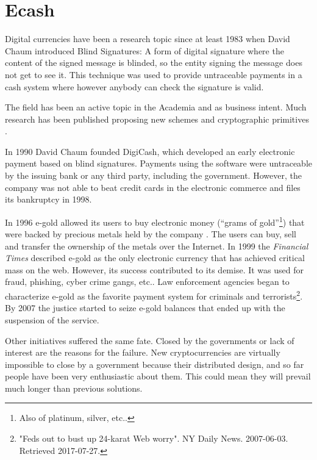 \section{Ecash}
Digital currencies have been a research topic since at least 1983 when David
  Chaum \cite{chaum1983blind} introduced Blind Signatures: A form of digital
  signature where the content of the signed message is blinded, so the entity
  signing the message does not get to see it. This technique was used to provide
  untraceable payments in a cash system where however anybody can check the
  signature is valid.

The field has been an active topic in the Academia and as business intent.
  Much research has been published proposing new schemes and
  cryptographic primitives \cite{okamoto1991universal,chaum1992achieving,
  boly1994esprit,anderson1996netcard,lysyanskaya1998group}.

In 1990 David Chaum founded DigiCash, which developed an early electronic
  payment based on blind signatures. Payments using the software were
  untraceable by the issuing bank or any third party, including the government.
However, the company was not able to beat credit cards in the electronic
  commerce and files its bankruptcy in 1998.

In 1996 e-gold allowed its users to buy electronic money (``grams of
  gold''\footnote{Also of platinum, silver, etc..}) that were backed by precious
  metals held by the company \cite{hughes2007developments}.
The users can buy, sell and transfer the ownership of the metals over the
  Internet. In 1999 the \textit{Financial Times} described e-gold as the only
  electronic currency that has achieved critical mass on the web.
However, its success contributed to its demise. It was used for fraud, phishing,
  cyber crime gangs, etc.. Law enforcement agencies began to characterize
  e-gold as the favorite payment system for criminals and terrorists\footnote{%
  "Feds out to bust up 24-karat Web worry". NY Daily News. 2007-06-03. Retrieved
  2017-07-27.}. By 2007 the justice started to seize e-gold balances that ended up
  with the suspension of the service.

Other initiatives suffered the same fate.
Closed by the governments or lack of interest are the reasons for the
  failure.
New cryptocurrencies are virtually impossible to close by a government because
  their distributed design, and so far people have been very enthusiastic about
  them.
This could mean they will prevail much longer than previous solutions.

